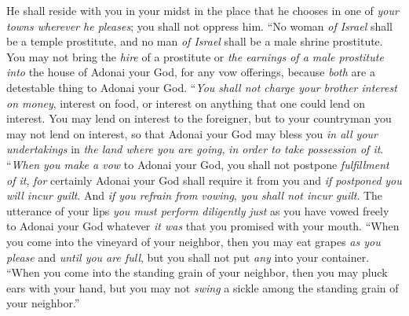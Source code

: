 \begin{biblechapter}
\verse He shall reside with you in your midst in the place that he chooses in one of \textit{your towns wherever he pleases}; you shall not oppress him.
\verse “No woman \textit{of Israel} shall be a temple prostitute, and no man \textit{of Israel} shall be a male shrine prostitute.
\verse You may not bring the \textit{hire} of a prostitute or \textit{the earnings of a male prostitute} \textit{into} the house of Adonai your God, for any vow offerings, because \textit{both} are a detestable thing to Adonai your God.
\verse “\textit{You shall not charge your brother interest on money}, interest on food, or interest on anything that one could lend on interest.
\verse You may lend on interest to the foreigner, but to your countryman you may not lend on interest, so that Adonai your God may bless you \textit{in all your undertakings} in \textit{the land where you are going}, \textit{in order to take possession of it}.
\verse “\textit{When you make a vow} to Adonai your God, you shall not postpone \textit{fulfillment of it}, \textit{for} certainly Adonai your God shall require it from you and \textit{if postponed} \textit{you will incur guilt}.
\verse And \textit{if you refrain from vowing}, \textit{you shall not incur guilt}.
\verse The utterance of your lips \textit{you must perform diligently} \textit{just} as you have vowed freely to Adonai your God whatever \textit{it was} that you promised with your mouth.
\verse “When you come into the vineyard of your neighbor, then you may eat grapes \textit{as you please} and \textit{until you are full}, but you shall not put \textit{any} into your container.
\verse “When you come into the standing grain of your neighbor, then you may pluck ears with your hand, but you may not \textit{swing} a sickle among the standing grain of your neighbor.”
\end{biblechapter}

